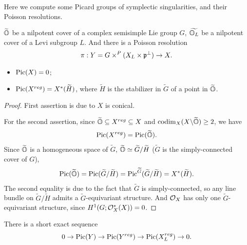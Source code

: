 Here we compute some Picard groups of symplectic singularities, and their Poisson resolutions.

$\widetilde{\mathbb{O}}$ be a nilpotent cover of a complex semisimple Lie group $G$, $\widetilde{\mathbb{O}_L}$ be a nilpotent cover of a Levi subgroup $L$. And there is a Poisson resolution
\[
  \pi: Y = G \times^{P} (X_L \times \mathfrak{p}^{\perp}) \to X.
\]

\begin{prop}
  \begin{itemize}
    \item $\operatorname{Pic}(X) = 0$;
    \item $\operatorname{Pic}(X^{reg}) = X^*(\widetilde{H})$, where $\widetilde{H}$ is the stabilizer in $\widetilde{G}$ of a point in $\widetilde{\mathbb{O}}$.
  \end{itemize}
\end{prop}

\begin{proof}
  First assertion is due to $X$ is conical.

  For the second assertion, since $\widetilde{\mathbb{O}} \subseteq X^{reg} \subseteq X$ and $\operatorname{codim}_{X}(X \backslash \widetilde{\mathbb{O}}) \geq 2$, we have
  \[\operatorname{Pic}(X^{reg}) = \operatorname{Pic}(\widetilde{\mathbb{O}}).\]
  Since $\widetilde{\mathbb{O}}$ is a homogeneous space of $\widetilde{G}$, $\widetilde{\mathbb{O}} \simeq \widetilde{G} / \widetilde{H}$ ($\widetilde{G}$ is the simply-connected cover of $G$),
  \[
    \operatorname{Pic}(\widetilde{\mathbb{O}}) = \operatorname{Pic}(\widetilde{G}/\widetilde{H}) = \operatorname{Pic}^{\widetilde{G}}(\widetilde{G}/\widetilde{H}) = X^*(\widetilde{H}).
  \]
  The second equality is due to the fact that $\widetilde{G}$ is simply-connected, so any line bundle on $\widetilde{G}/\widetilde{H}$ admits a $\widetilde{G}$-equivariant structure. And $\mathcal{O}_X$ has only one $\widetilde{G}$-equivariant structure, since $H^1(G;\mathcal{O}^*_X(X)) = 0$.
\end{proof}

\begin{prop}
  There is a short exact sequence
  \[
     0 \to \operatorname{Pic}(Y) \to \operatorname{Pic}(Y^{reg}) \to \operatorname{Pic}(X_L^{reg}) \to 0.
  \]
\end{prop}

